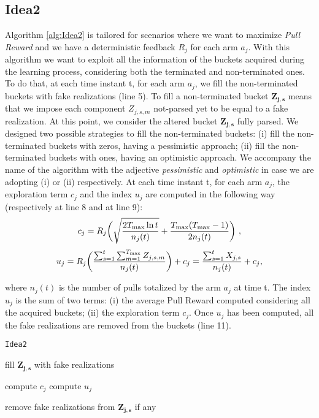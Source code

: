\subsection{Idea2}
Algorithm \ref{alg:Idea2} is tailored for scenarios where we want to maximize \emph{Pull Reward} and we have a deterministic feedback $R_j$ for each arm $a_j$. With this algorithm we want to exploit all the information of the buckets acquired during the learning process, considering both the terminated and non-terminated ones. To do that, at each time instant t, for each arm $a_j$, we fill the non-terminated buckets with fake realizations (line 5). To fill a non-terminated bucket $\boldsymbol{Z_{j,s}}$ means that we impose each component $Z_{j,s,m}$ not-parsed yet to be equal to a fake realization. At this point, we consider the altered bucket $\boldsymbol{Z_{j,s}}$ fully parsed. We designed two possible strategies to fill the non-terminated buckets: (i)
fill the non-terminated buckets with zeros, having a pessimistic approach; (ii) fill the non-terminated buckets with ones, having an optimistic approach. We accompany the name of the algorithm with the adjective \emph{pessimistic} and \emph{optimistic} in case we are adopting (i) or (ii) respectively. At each time instant t, for each arm $a_j$, the exploration term $c_j$ and the index $u_j$ are computed in the following way (respectively at line 8 and at line 9):
$$c_j = R_j \bigg( \sqrt{\frac{2T_{\textnormal{max}}\ln{t}}{n_j(t)}} + \frac{T_{\textnormal{max}}(T_{\textnormal{max}}-1)}{2n_j(t)} \bigg) \ ,$$ 
$$
u_j = R_j \bigg( \frac{\sum_{s=1}^{t}\sum_{m=1}^{T_{\textnormal{max}}}Z_{j,s,m}}{n_j(t)}\bigg)+c_j   = \frac{\sum_{s=1}^{t} X_{j,s}}{n_j(t)} +c_j  ,
$$

where $n_j(t)$ is the number of pulls totalized by the arm $a_j$ at time t. The index $u_j$ is the sum of two terms: (i) the average Pull Reward computed considering all the acquired buckets; (ii) the exploration term  $c_j$. Once $u_j$ has been computed, all the fake realizations are removed from the buckets (line 11).

\begin{algorithm}[H]
	\caption{\texttt{Idea2}}
	\begin{scriptsize}
		\begin{algorithmic}[1]
			
			
			
			
			\State fill $\boldsymbol{Z_{j,s}}$ with fake realizations
			\EndIf
			
			\EndFor		
			\State compute $c_j$\;
			\State compute $u_j$\;
			
			\State remove fake realizations from $\boldsymbol{Z_{j,s}}$ if any			
			\EndFor
			
	
							
			\EndFor
			
					
			\EndFunction
			
		\end{algorithmic}
	\end{scriptsize}
	\label{alg:Idea2}
\end{algorithm}




